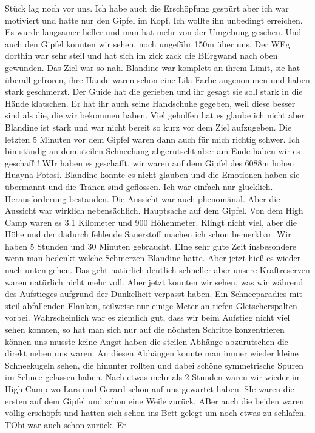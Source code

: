 \documentclass[11pt]{book}
\begin{document}
Stück lag noch vor uns. Ich habe auch die Erschöpfung gespürt aber ich war motiviert und hatte nur den Gipfel im Kopf. Ich wollte ihn unbedingt erreichen. 
Es wurde langsamer heller und man hat mehr von der Umgebung gesehen. Und auch den Gipfel konnten wir sehen, noch ungefähr 150m über uns. Der WEg dorthin 
war sehr steil und hat sich im zick zack die BErgwand nach oben gewunden. Das Ziel war so nah. Blandine war komplett an ihrem Limit, sie hat überall 
gefroren, ihre Hände waren schon eine Lila Farbe angenommen und haben stark geschmerzt. Der Guide hat die gerieben und ihr gesagt sie soll stark in die 
Hände klatschen. Er hat ihr auch seine Handschuhe gegeben, weil diese besser sind als die, die wir bekommen haben. Viel geholfen hat es glaube ich nicht 
aber Blandine ist stark und war nicht bereit so kurz vor dem Ziel aufzugeben. Die letzten 5 Minuten vor dem Gipfel waren dann auch für mich richtig 
schwer. Ich bin ständig an dem steilen Schneehang abgerutscht aber am Ende haben wir es geschafft! WIr haben es geschafft, wir waren auf dem Gipfel des 
6088m hohen Huayna Potosi. Blandine konnte es nicht glauben und die Emotionen haben sie übermannt und die Tränen sind geflossen. Ich war einfach nur 
glücklich. Herausforderung bestanden. Die Aussicht war auch phenomänal. Aber die Aussicht war wirklich nebensächlich. Hauptsache auf dem Gipfel. 
Von dem High Camp waren es 3.1 Kilometer und 900 Höhenmeter. Klingt nicht viel, aber die Höhe und der dadurch fehlende Sauerstoff machen ich schon bemerkbar. 
Wir haben 5 Stunden und 30 Minuten gebraucht. EIne sehr gute Zeit insbesondere wenn man bedenkt welche Schmerzen Blandine hatte. Aber jetzt hieß es 
wieder nach unten gehen. Das geht natürlich deutlich schneller aber unsere Kraftreserven waren natürlich nicht mehr voll. Aber jetzt konnten wir sehen, 
was wir während des Aufstieges aufgrund der Dunkelheit verpasst haben. Ein Schneeparadies mit steil abfallenden Flanken, teilweise nur einige Meter 
an tiefen Gletscherspalten vorbei. Wahrscheinlich war es ziemlich gut, dass wir beim Aufstieg nicht viel sehen konnten, so hat man sich nur auf die 
nöchsten Schritte konzentrieren können uns musste keine Angst haben die steilen Abhänge abzurutschen die direkt neben uns waren. An diesen Abhängen 
konnte man immer wieder kleine Schneekugeln sehen, die hinunter rollten und dabei schöne symmetrische Spuren im Schnee gelassen haben. Nach etwas mehr 
als 2 Stunden waren wir wieder im High Camp wo Lars und Gerard schon auf uns gewartet haben. SIe waren die ersten auf dem Gipfel und schon eine Weile 
zurück. ABer auch die beiden waren völlig erschöpft und hatten sich schon ins Bett gelegt um noch etwas zu schlafen. TObi war auch schon zurück. Er 
\end{document}
